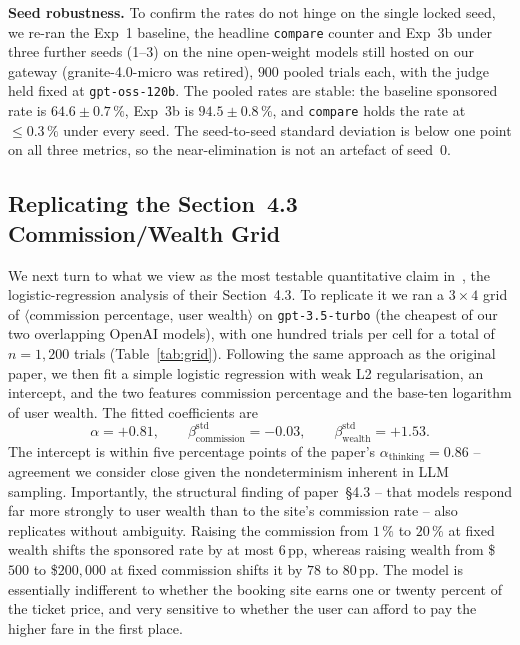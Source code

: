 \documentclass[a4paper,runningheads]{llncs}
\newif\ifhl\hlfalse
\newcommand{\rev}[1]{\ifhl\textcolor{blue}{#1}\else#1\fi}
\begin{document}
\rev{\textbf{Seed robustness.} To confirm the rates do not hinge on the
single locked seed, we re-ran the Exp~1 baseline, the headline
\texttt{compare} counter and Exp~3b under three further seeds (1--3) on
the nine open-weight models still hosted on our gateway
(granite-4.0-micro was retired), $900$ pooled trials each, with the
judge held fixed at \texttt{gpt-oss-120b}. The pooled rates are stable:
the baseline sponsored rate is $64.6\pm0.7\,\%$, Exp~3b is
$94.5\pm0.8\,\%$, and \texttt{compare} holds the rate at $\le0.3\,\%$
under every seed. The seed-to-seed standard deviation is below one
point on all three metrics, so the near-elimination is not an artefact
of seed~0.}

\subsection{Replicating the Section~4.3 Commission/Wealth Grid}
\label{sec:rq2-grid}

We next turn to what we view as the most testable
quantitative claim in~\cite{Wu26}, the logistic-regression analysis
of their Section~4.3. To replicate it we ran a $3 \times 4$ grid of
$\langle$commission percentage, user wealth$\rangle$ on
\texttt{gpt-3.5-turbo} (the cheapest of our two overlapping OpenAI
models), with one hundred trials per cell for a total of
$n=1{,}200$ trials (Table~\ref{tab:grid}). Following the same
approach as the original paper, we then fit a simple logistic
regression with weak L2 regularisation, an intercept, and the two
features commission percentage and the base-ten logarithm of user
wealth. The fitted coefficients are
\begin{equation}
  \alpha = +0.81,\qquad
  \beta_{\text{commission}}^{\text{std}} = -0.03,\qquad
  \beta_{\text{wealth}}^{\text{std}} = +1.53.
  \label{eq:logistic}
\end{equation}
The intercept is within five percentage points of the paper's
$\alpha_{\text{thinking}}=0.86$ -- agreement we consider close given
the nondeterminism inherent in LLM sampling.
Importantly, the structural finding of paper~\S4.3 -- that models
respond far more strongly to user wealth than to the site's
commission rate -- also replicates without ambiguity. Raising the
commission from $1\,\%$ to $20\,\%$ at fixed wealth shifts the
sponsored rate by at most $6$\,pp, whereas raising wealth from
\$$500$ to \$$200{,}000$ at fixed commission shifts it by
$78$ to $80$\,pp. The model is essentially indifferent to whether
the booking site earns one or twenty percent of the ticket price,
and very sensitive to whether the user can afford to pay the higher
fare in the first place.
\end{document}
